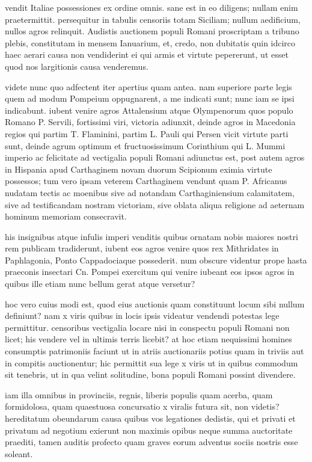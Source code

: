  vendit Italiae possessiones ex ordine omnis. sane est in eo diligens; nullam enim praetermittit. persequitur in tabulis censoriis totam Siciliam; nullum aedificium, nullos agros relinquit. Audistis auctionem populi Romani proscriptam a tribuno plebis, constitutam in mensem Ianuarium, et, credo, non dubitatis quin idcirco haec aerari causa non vendiderint ei qui armis et virtute pepererunt, ut esset quod nos largitionis causa venderemus.

 videte nunc quo adfectent iter apertius quam antea. nam superiore parte legis quem ad modum Pompeium oppugnarent, a me indicati sunt; nunc iam se ipsi indicabunt. iubent venire agros Attalensium atque Olympenorum quos populo Romano P. Servili, fortissimi viri, victoria adiunxit, deinde agros in Macedonia regios qui partim T. Flaminini, partim L. Pauli qui Persen vicit virtute parti sunt, deinde agrum optimum et fructuosissimum Corinthium qui L. Mummi imperio ac felicitate ad vectigalia populi Romani adiunctus est, post autem agros in Hispania apud Carthaginem novam duorum Scipionum eximia virtute possessos; tum vero ipsam veterem Carthaginem vendunt quam P. Africanus nudatam tectis ac moenibus sive ad notandam Carthaginiensium calamitatem, sive ad testificandam nostram victoriam, sive oblata aliqua religione ad aeternam hominum memoriam consecravit.

 his insignibus atque infulis imperi venditis quibus ornatam nobis maiores nostri rem publicam tradiderunt, iubent eos agros venire quos rex Mithridates in Paphlagonia, Ponto Cappadociaque possederit. num obscure videntur prope hasta praeconis insectari Cn. Pompei exercitum qui venire iubeant eos ipsos agros in quibus ille etiam nunc bellum gerat atque versetur?

 hoc vero cuius modi est, quod eius auctionis quam constituunt locum sibi nullum definiunt? nam x viris quibus in locis ipsis videatur vendendi potestas lege permittitur. censoribus vectigalia locare nisi in conspectu populi Romani non licet; his vendere vel in ultimis terris licebit? at hoc etiam nequissimi homines consumptis patrimoniis faciunt ut in atriis auctionariis potius quam in triviis aut in compitis auctionentur; hic permittit sua lege x viris ut in quibus commodum sit tenebris, ut in qua velint solitudine, bona populi Romani possint divendere.

 iam illa omnibus in provinciis, regnis, liberis populis quam acerba, quam formidolosa, quam quaestuosa concursatio x viralis futura sit, non videtis? hereditatum obeundarum causa quibus vos legationes dedistis, qui et privati et privatum ad negotium exierunt non maximis opibus neque summa auctoritate praediti, tamen auditis profecto quam graves eorum adventus sociis nostris esse soleant.

